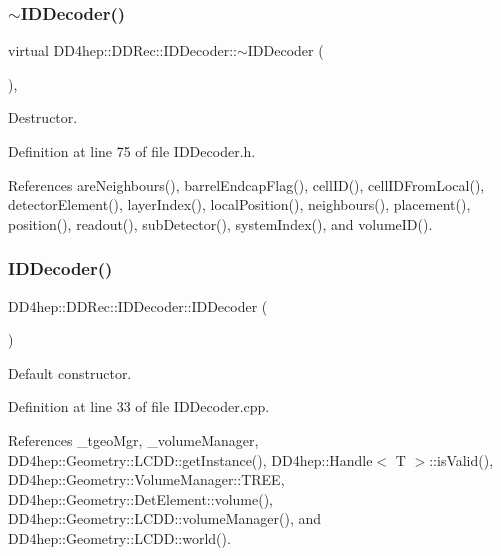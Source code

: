 \subsubsection{\texorpdfstring{$\sim$\+I\+D\+Decoder()}{~IDDecoder()}}
{\footnotesize\ttfamily virtual D\+D4hep\+::\+D\+D\+Rec\+::\+I\+D\+Decoder\+::$\sim$\+I\+D\+Decoder (\begin{DoxyParamCaption}{ }\end{DoxyParamCaption})\hspace{0.3cm}{\ttfamily [inline]}, {\ttfamily [virtual]}}



Destructor. 



Definition at line 75 of file I\+D\+Decoder.\+h.



References are\+Neighbours(), barrel\+Endcap\+Flag(), cell\+I\+D(), cell\+I\+D\+From\+Local(), detector\+Element(), layer\+Index(), local\+Position(), neighbours(), placement(), position(), readout(), sub\+Detector(), system\+Index(), and volume\+I\+D().

\hypertarget{class_d_d4hep_1_1_d_d_rec_1_1_i_d_decoder_af0d078d2fd6039aadb63d113b7a83367}{}\label{class_d_d4hep_1_1_d_d_rec_1_1_i_d_decoder_af0d078d2fd6039aadb63d113b7a83367} 
\subsubsection{\texorpdfstring{I\+D\+Decoder()}{IDDecoder()}\hspace{0.1cm}{\footnotesize\ttfamily [1/2]}}
{\footnotesize\ttfamily D\+D4hep\+::\+D\+D\+Rec\+::\+I\+D\+Decoder\+::\+I\+D\+Decoder (\begin{DoxyParamCaption}{ }\end{DoxyParamCaption})\hspace{0.3cm}{\ttfamily [private]}}



Default constructor. 



Definition at line 33 of file I\+D\+Decoder.\+cpp.



References \+\_\+tgeo\+Mgr, \+\_\+volume\+Manager, D\+D4hep\+::\+Geometry\+::\+L\+C\+D\+D\+::get\+Instance(), D\+D4hep\+::\+Handle$<$ T $>$\+::is\+Valid(), D\+D4hep\+::\+Geometry\+::\+Volume\+Manager\+::\+T\+R\+EE, D\+D4hep\+::\+Geometry\+::\+Det\+Element\+::volume(), D\+D4hep\+::\+Geometry\+::\+L\+C\+D\+D\+::volume\+Manager(), and D\+D4hep\+::\+Geometry\+::\+L\+C\+D\+D\+::world().

